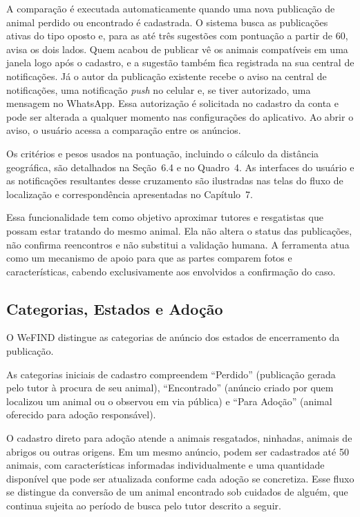 A comparação é executada automaticamente quando uma nova publicação de animal perdido ou encontrado é cadastrada. O sistema busca as publicações ativas do tipo oposto e, para as até três sugestões com pontuação a partir de 60, avisa os dois lados. Quem acabou de publicar vê os animais compatíveis em uma janela logo após o cadastro, e a sugestão também fica registrada na sua central de notificações. Já o autor da publicação existente recebe o aviso na central de notificações, uma notificação \textit{push} no celular e, se tiver autorizado, uma mensagem no WhatsApp. Essa autorização é solicitada no cadastro da conta e pode ser alterada a qualquer momento nas configurações do aplicativo. Ao abrir o aviso, o usuário acessa a comparação entre os anúncios.

Os critérios e pesos usados na pontuação, incluindo o cálculo da distância geográfica, são detalhados na Seção~6.4 e no Quadro~4. As interfaces do usuário e as notificações resultantes desse cruzamento são ilustradas nas telas do fluxo de localização e correspondência apresentadas no Capítulo~7.

Essa funcionalidade tem como objetivo aproximar tutores e resgatistas que possam estar tratando do mesmo animal. Ela não altera o status das publicações, não confirma reencontros e não substitui a validação humana. A ferramenta atua como um mecanismo de apoio para que as partes comparem fotos e características, cabendo exclusivamente aos envolvidos a confirmação do caso.


\subsection{Categorias, Estados e Adoção}\label{sec:categorias}

O WeFIND distingue as categorias de anúncio dos estados de encerramento da publicação.

As categorias iniciais de cadastro compreendem ``Perdido'' (publicação gerada pelo tutor à procura de seu animal), ``Encontrado'' (anúncio criado por quem localizou um animal ou o observou em via pública) e ``Para Adoção'' (animal oferecido para adoção responsável).

O cadastro direto para adoção atende a animais resgatados, ninhadas, animais de abrigos ou outras origens. Em um mesmo anúncio, podem ser cadastrados até 50 animais, com características informadas individualmente e uma quantidade disponível que pode ser atualizada conforme cada adoção se concretiza. Esse fluxo se distingue da conversão de um animal encontrado sob cuidados de alguém, que continua sujeita ao período de busca pelo tutor descrito a seguir.

